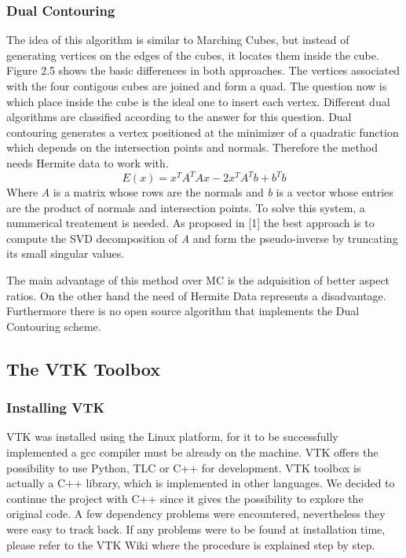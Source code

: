\subsubsection{Dual Contouring}
The idea of this algorithm is similar to Marching Cubes, but instead of generating vertices on the
edges of the cubes, it locates them inside the cube. Figure 2.5 shows the basic differences in both approaches.
The vertices associated with the four contigous cubes are joined and form a quad. The question now is
which place inside the cube is the ideal one to insert each vertex. Different dual algorithms are classified 
according to the answer for this question. Dual contouring generates a vertex positioned at the minimizer of a
quadratic function which depends on the intersection points and normals. Therefore the method needs Hermite 
data to work with.
\begin{equation*}
E(x)= x^TA^TAx-2x^TA^Tb+b^Tb
\end{equation*}
Where \textit{A} is a matrix whose rows are the normals and \textit{b} is a vector whose entries are the product of normals and intersection points. To solve this system, a nummerical treatement is needed. As proposed in [1] the best approach is to compute the
SVD decomposition of \textit{A} and form the pseudo-inverse by truncating its small singular values. 


The main advantage of this method over MC is the adquisition of better aspect ratios. On the other hand the need of Hermite Data
represents a disadvantage. Furthermore there is no open source algorithm that implements the Dual Contouring scheme.


\subsection{The VTK Toolbox}
\subsubsection{Installing VTK}
VTK was installed using the Linux platform, for it to be successfully implemented a gcc compiler
must be already on the machine. VTK offers the possibility to use Python, TLC or C++ for
development. VTK toolbox is actually a C++ library, which is implemented in other languages. We
decided to continue the project with C++ since it gives the possibility to explore the original code.
A few dependency problems were encountered, nevertheless they were easy to track back. If any
problems were to be found at installation time, please refer to the VTK Wiki where the procedure
is explained step by step.

